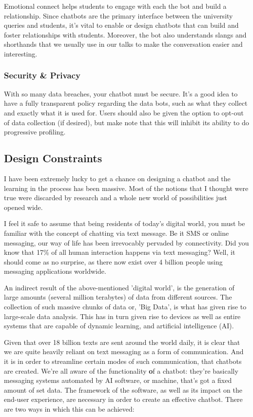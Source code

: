 \documentclass[14pt]{extarticle}
\begin{document}
Emotional connect helps students to engage with each the bot and build a relationship. Since chatbots are the primary interface between the university queries and students, it's vital to enable or design chatbots that can build and foster relationships with students. Moreover, the bot also understands slangs and shorthands that we usually use in our talks to make the conversation easier and interesting.

\subsubsection {Security \& Privacy}

With so many data breaches, your chatbot must be secure. It's a good idea to have a fully transparent policy regarding the data bots, such as what they collect and exactly what it is used for. Users should also be given the option to opt-out of data collection (if desired), but make note that this will inhibit its ability to do progressive profiling.

\subsection{Design Constraints}

I have been extremely lucky to get a chance on designing a chatbot and the learning in the process has been massive. Most of the notions that I thought were true were discarded by research and a whole new world of possibilities just opened wide.

I feel it safe to assume that being residents of today's digital world, you must be familiar with the concept of chatting via text message. Be it SMS or online messaging, our way of life has been irrevocably pervaded by connectivity. Did you know that 17\% of all human interaction happens via text messaging? Well, it should come as no surprise, as there now exist over 4 billion people using messaging applications worldwide.

An indirect result of the above-mentioned 'digital world', is the generation of large amounts (several million terabytes) of data from different sources. The collection of such massive chunks of data or, 'Big Data', is what has given rise to large-scale data analysis. This has in turn given rise to devices as well as entire systems that are capable of dynamic learning, and artificial intelligence (AI).

Given that over 18 billion texts are sent around the world daily, it is clear that we are quite heavily reliant on text messaging as a form of communication. And it is in order to streamline certain modes of such communication, that chatbots are created. We're all aware of the functionality \textbf of a chatbot: they're basically messaging systems automated by AI software, or machine, that's got a fixed amount of set data. The framework of the software, as well as its impact on the end-user experience, are necessary in order to create an effective chatbot. There are two ways in which this can be achieved:
\end{document}
